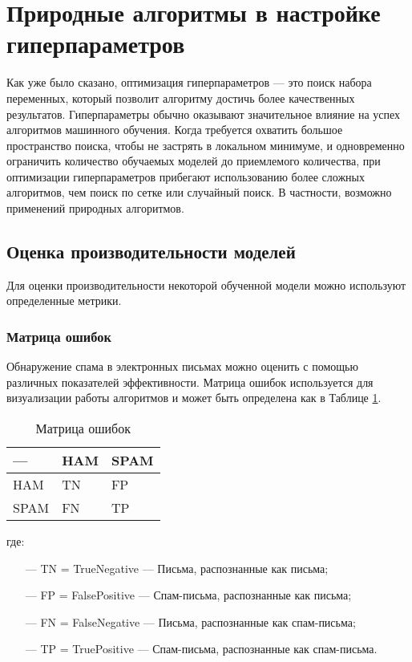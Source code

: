 \section{Природные алгоритмы в настройке гиперпараметров}\label{Section:Performance}

Как уже было сказано, оптимизация гиперпараметров — это поиск набора переменных, который позволит
алгоритму достичь более качественных результатов. Гиперпараметры обычно оказывают
значительное влияние на успех алгоритмов машинного обучения.
Когда требуется охватить большое пространство поиска, чтобы не застрять
в локальном минимуме, и одновременно ограничить количество обучаемых
моделей до приемлемого количества, при оптимизации гиперпараметров прибегают
использованию более сложных алгоритмов, чем поиск по сетке или случайный поиск.
В частности, возможно применений природных алгоритмов.

\subsection{Оценка производительности моделей}\label{Scorer}

Для оценки производительности некоторой обученной модели можно используют определенные метрики.

\subsubsection{Матрица ошибок}

Обнаружение спама в электронных письмах можно оценить с помощью
различных показателей эффективности. Матрица ошибок используется для
визуализации работы алгоритмов и может быть определена как в Таблице \ref{table1}.

\begin{table}[!ht]
    \centering
    \caption{Матрица ошибок}
    \begin{tabular}{|p{}|p{}|p{}|}
    \hline
        — & HAM & SPAM \\ \hline
        HAM & TN & FP \\ \hline
        SPAM & FN & TP \\ \hline
    \end{tabular}
    \label{table1}
\end{table}
где:

\begin{itemize}
    \item[—] TN = TrueNegative — Письма, распознанные как письма;
    \item[—] FP = FalsePositive — Спам-письма, распознанные как письма;
    \item[—] FN = FalseNegative — Письма, распознанные как спам-письма;
    \item[—] TP = TruePositive — Спам-письма, распознанные как спам-письма.
\end{itemize}


